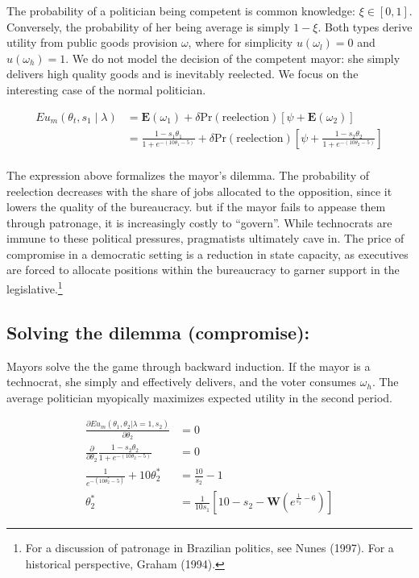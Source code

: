 \documentclass[12pt,]{article}
\let\rmarkdownfootnote\footnote%
\def\footnote{\protect\rmarkdownfootnote}
\begin{document}
The probability of a politician being competent is common knowledge:
\(\xi \in [0,1]\). Conversely, the probability of her being average is
simply \(1 - \xi\). Both types derive utility from public goods
provision \(\omega\), where for simplicity \(u(\omega_l)=0\) and
\(u(\omega_h) = 1\). We do not model the decision of the competent
mayor: she simply delivers high quality goods and is inevitably
reelected. We focus on the interesting case of the normal politician.

\begin{align*}
Eu_m \left(\theta_t, s_1 \middle|\lambda \right) &= \textbf{E}(\omega_1) + \delta \text{Pr}(\text{reelection})\left[\psi + \textbf{E}(\omega_2)  \right] \\
&= \frac{1-s_1\theta_1}{1+e^{-(10\theta_1-5)}} + \delta \text{Pr}(\text{reelection})\left[\psi + \frac{1-s_2\theta_2}{1+e^{-(10\theta_2-5)}} \right] \\
\end{align*}

The expression above formalizes the mayor's dilemma. The probability of
reelection decreases with the share of jobs allocated to the opposition,
since it lowers the quality of the bureaucracy. but if the mayor fails
to appease them through patronage, it is increasingly costly to
``govern''. While technocrats are immune to these political pressures,
pragmatists ultimately cave in. The price of compromise in a democratic
setting is a reduction in state capacity, as executives are forced to
allocate positions within the bureaucracy to garner support in the
legislative.\footnote{For a discussion of patronage in Brazilian
  politics, see Nunes (1997). For a historical perspective, Graham
  (1994).}

\hypertarget{solving-the-dilemma-compromise}{%
\subsection{Solving the dilemma
(compromise):}\label{solving-the-dilemma-compromise}}

Mayors solve the the game through backward induction. If the mayor is a
technocrat, she simply and effectively delivers, and the voter consumes
\(\omega_h\). The average politician myopically maximizes expected
utility in the second period.

\begin{align*}
\frac{\partial Eu_{m}(\theta_1, \theta_2|\lambda = 1, s_2)}{\partial \theta_2} &= 0 \\
\frac{\partial}{\partial \theta_2} \frac{1-s_2\theta_2}{1+e^{-(10\theta_2-5)}} &= 0 \\
\frac{1}{e^{-(10\theta_2^*-5)}}+10\theta_2^* &= \frac{10}{s_2} - 1\\
\theta_2^* &= \frac{1}{10s_1}\left[10-s_2-\boldsymbol{W}\left(e^{\frac{1}{s_2}-6}\right)\right]
\end{align*}
\end{document}
